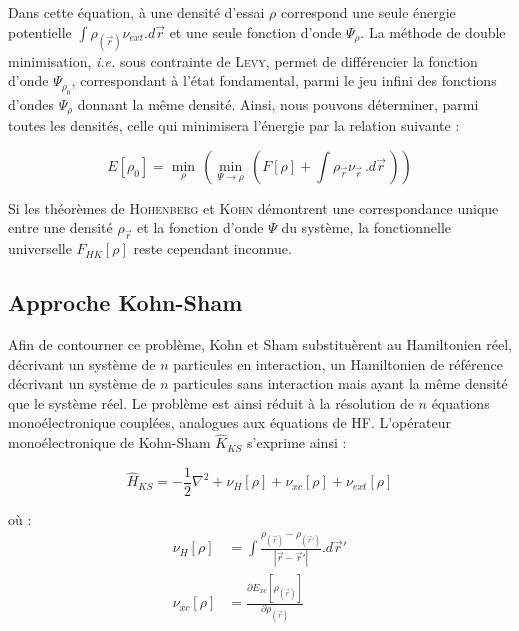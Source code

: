 	Dans cette équation, à une densité d'essai $\rho$ correspond une seule énergie potentielle $\int \rho_{(\vec{r})} \nu_{ext} .d\vec{r}$ et une seule fonction d'onde $\Psi_{\rho}$. La méthode de double minimisation, \textit{i.e.} sous contrainte de \textsc{Levy}, permet de différencier la fonction d'onde $\Psi_{\rho_{0}}$, correspondant à l'état fondamental, parmi le jeu infini des fonctions d'ondes $\Psi_{\rho}$ donnant la même densité. Ainsi, nous pouvons déterminer, parmi toutes les densités, celle qui minimisera l'énergie par la relation suivante :
	
	\begin{equation}
	E[\rho_{0}] = \min\limits_{\rho}\, (\min\limits_{\Psi\rightarrow\rho}\, (F[\rho] + \int \rho_{\vec{r}} \nu_{\vec{r}}\, .d\vec{r}\, ))
	\end{equation}
	
	Si les théorèmes de \textsc{Hohenberg} et \textsc{Kohn} démontrent une correspondance unique entre une densité $\rho_{\vec{r}}$ et la fonction d'onde $\Psi$ du système, la fonctionnelle universelle $F_{HK}[\rho]$ reste cependant inconnue.
	
	\subsection{Approche Kohn-Sham}\label{Kohn-Sham}
	
	Afin de contourner ce problème, Kohn et Sham substituèrent au Hamiltonien réel, décrivant un système de $n$ particules en interaction, un Hamiltonien de référence décrivant un système de $n$ particules sans interaction mais ayant la même densité que le système réel. Le problème est ainsi réduit à la résolution de $n$ équations monoélectronique couplées, analogues aux équations de HF. L'opérateur monoélectronique de Kohn-Sham $\hat{K}_{KS}$ s'exprime ainsi :
	
	\begin{equation}
	\hat{H}_{KS} = -\frac{1}{2} \nabla^{2} + \nu_{H}[\rho] + \nu_{xc}[\rho] + \nu_{ext}[\rho]
	\end{equation}
	
	\noindent où :
	\begin{align}
	\nu_{H}[\rho] &= \int \frac{\rho_{(\vec{r})} - \rho_{(\vec{r}')}}{|\vec{r} - \vec{r}'|} .d\vec{r}' \\
	\nu_{xc}[\rho] &= \frac{\partial E_{xc}[\rho_{(\vec{r})}]}{\partial\rho_{(\vec{r})}}
	\end{align}
	
